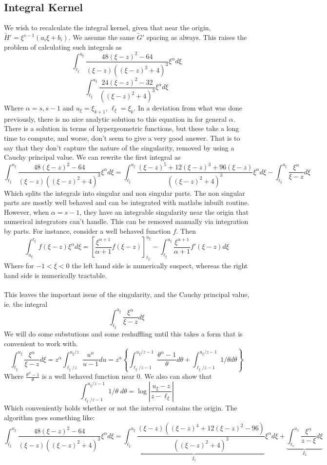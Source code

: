 \documentclass{article}
\begin{document}
\subsection{Integral Kernel}
We wish to recalculate the integral kernel, given that near the origin,
$\tilde{H}' = \xi^{s-1} (a_i \xi + b_i)$. We assume the same $\tilde{G}'$
spacing as always. This raises the problem of calculating such integrals as
\[ \int_{\ell_\xi}^{u_\xi} \frac{48(\xi-z)^2 -64}{(\xi-z)( (\xi-z)^2+4)^3}
\xi^{\alpha} d\xi \]
\[ \int_{\ell_\xi}^{u_\xi} \frac{24(\xi-z)^2 -32}{( (\xi-z)^2+4)^3}
\xi^{\alpha} d\xi \]
Where $\alpha = s,s-1$ and $u_\xi = \xi_{k+1}$, $\ell_{\xi} = \xi_k$.
In a deviation from what was done previously, there is no nice analytic solution
to this equation in for general $\alpha$. There is a solution in terms of 
hypergeometric functions, but these take a long time to compute, and worse, 
don't seem to give a very good answer. That is to say that they don't capture
the nature of the singularity, removed by using a Cauchy principal value.
We can rewrite the first integral as 
\[ \int_{\ell_\xi}^{u_\xi} \frac{48(\xi-z)^2 -64}{(\xi-z)( (\xi-z)^2+4)^3}
\xi^{\alpha} d\xi = \int_{\ell_\xi}^{u_\xi} \frac{(\xi-z)^5 + 12 (\xi-z)^3 + 
96(\xi-z)}{((\xi-z)^2 +4)^3} \xi^{\alpha} d \xi - 
 \int_{\ell_\xi}^{u_\xi} \frac{\xi^{\alpha}}{\xi-z} d\xi \]
Which splits the integrals into singular and non singular parts. The non 
singular parts are mostly well behaved and can be integrated with matlabs
inbuilt routine. However, when $\alpha = s-1$, they have an integrable
singularity near the origin that numerical integrators can't handle. This 
can be removed manually via integration by parts. For instance, consider
a well behaved function $f$. Then
\[ \int_{u_\xi}^{\ell_\xi} f(\xi - z) \xi^{\alpha} d\xi = \left[
\frac{\xi^{\alpha+1}}{\alpha+1} f(\xi - z) \right]_{\ell_\xi}^{u_\xi} 
- \int_{\ell_\xi}^{u_\xi} \frac{\xi^{\alpha+1}}{\alpha+1} f'(\xi -z)d\xi\]
Where for $-1 < \xi < 0$ the left hand side is numerically suspect, whereas
the right hand side is numerically tractable.
\\
\\
This leaves the important issue of the singularity, and the Cauchy principal
value, ie. the integral
\[ \int_{\ell_\xi}^{u_\xi} \frac{\xi^{\alpha}}{\xi-z} d\xi \]
We will do some substutions and some reshuffling until this takes a form that
is convenient to work with. 
\[ \int_{\ell_\xi}^{u_\xi} \frac{\xi^{\alpha}}{\xi-z} d\xi = 
z^{\alpha} \int_{\ell_\xi/z}^{u_\xi/z} \frac{u^{\alpha}}{u-1} du = 
 z^{\alpha} \left\{ \int_{\ell_\xi/z-1}^{u_\xi/z-1} 
\frac{\theta^{\alpha}-1}{\theta} d\theta +  \int_{\ell_\xi/z-1}^{u_\xi/z-1}
1/\theta d \theta 
\right\}\]
Where $\frac{\theta^{\alpha}-1}{\theta}$ is a well behaved function near 0.
We also can show that 
\[\int_{\ell_\xi/z-1}^{u_\xi/z-1} 1/\theta \; d \theta = \log \left| 
\frac{u_\xi - z}{z - \ell_\xi} \right|\]
Which conveniently holds whether or not the interval contains the origin.
The algorithm goes something like:
\[ \int_{\ell_\xi}^{u_\xi} \frac{48(\xi-z)^2-64}{(\xi-z)( (\xi-z)^2 + 4)^3} 
\xi^{\alpha} d\xi= 
\underbrace{\int_{\ell_\xi}^{u_\xi} 
\frac{(\xi-z)((\xi-z)^4+12(\xi-z)^2-96)}{( (\xi-z)^2 + 4)^3}}_{I_1} 
\xi^{\alpha} d\xi +
\underbrace{ \int_{\ell_x}^{u_x} \frac{\xi^{\alpha}}{z-\xi} d\xi}_{I_2} \]
\end{document}
